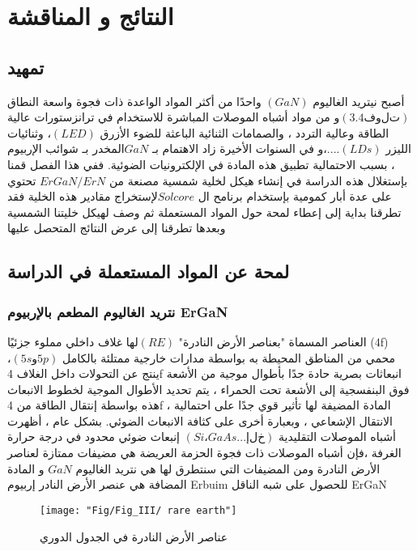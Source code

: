 \chapter{النتائج و المناقشة } %

\label{Chapter3} %

\section{ تمهيد}
أصبح نيتريد الغاليوم $ (GaN) $ واحدًا من أكثر المواد الواعدة ذات فجوة واسعة النطاق $ (3.4 فولت)  $و من مواد أشباه الموصلات المباشرة للاستخدام في ترانزستورات عالية الطاقة وعالية التردد ،  والصمامات الثنائية الباعثة للضوء الأزرق $ (LED)  $، وثنائيات الليزر $ (LDs)  $....،و في السنوات الأخيرة زاد الاهتمام بـ $ GaN  $المخدر بـ  شوائب الإربيوم ، بسبب الاحتمالية تطبيق هذه المادة في الإلكترونيات الضوئية.
ففي هذا الفصل قمنا بإستغلال هذه الدراسة في إنشاء هيكل لخلية شمسية  مصنعة من $ ErGaN / ErN  $ تحتوي على عدة أبار كمومية بإستخدام برنامح ال $ Solcore  $لإستخراج مقادير هذه الخلية فقد تطرقنا بداية إلى إعطاء لمحة حول المواد المستعملة ثم وصف لهيكل خليتنا الشمسية وبعدها تطرقنا إلى عرض النتائج المتحصل عليها 
\section{   لمحة عن المواد المستعملة في الدراسة  }
\subsection{  نتريد الغاليوم المطعم بالإربيوم ErGaN   }
العناصر المسماة "بعناصر الأرض النادرة" $ (RE)  $لها غلاف داخلي مملوء جزئيًا (4f) محمي من المناطق المحيطة به بواسطة مدارات خارجية ممتلئة بالكامل $ (5s و 5p)  $، ينتج عن التحولات داخل الغلاف 4f انبعاثات بصرية حادة جدًا بأطوال موجية من الأشعة فوق البنفسجية إلى الأشعة تحت الحمراء ، يتم تحديد الأطوال الموجية لخطوط الانبعاث هذه بواسطة  إنتقال الطاقة من   4f ، المادة المضيفة لها تأثير قوي جدًا على احتمالية الانتقال الإشعاعي ، وبعبارة أخرى على كثافة الانبعاث الضوئي. بشكل عام ، أظهرت أشباه الموصلات التقليدية  $ (Si ، GaAs ... إلخ)  $ إنبعاث ضوئي محدود في درجة حرارة الغرفة ،فإن أشباه الموصلات ذات فجوة الحزمة العريضة  هي مضيفات    ممتازة  لعناصر الأرض النادرة ومن المضيفات التي سنتطرق لها هي نتريد الغاليوم $ GaN  $ و المادة المضافة هي عنصر الأرض النادر إربيوم Erbuim
للحصول على شبه الناقل ErGaN  
\begin{figure}[h!]
	\centering
	\texttt{[image: "Fig/Fig\_III/ rare earth"]}
	\caption{عناصر الأرض النادرة في الجدول الدوري }
	\label{fig:-rare-earth}
\end{figure}
\FloatBarrier
